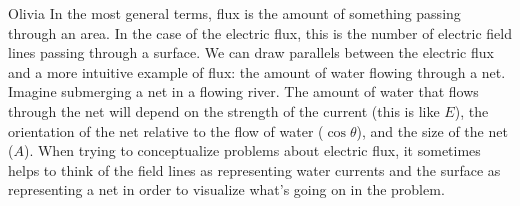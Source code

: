 \begin{studentOpinion}{Olivia}
In the most general terms, flux is the amount of something passing through an area. In the case of the electric flux, this is the number of electric field lines passing through a surface. We can draw parallels between the electric flux and a more intuitive example of flux: the amount of water flowing through a net. Imagine submerging a net in a flowing river. The amount of water that flows through the net will depend on the strength of the current (this is like $E$), the orientation of the net relative to the flow of water ($\cos\theta$), and the size of the net ($A$). When trying to conceptualize problems about electric flux, it sometimes helps to think of the field lines as representing water currents and the surface as representing a net in order to visualize what's going on in the problem. 
\end{studentOpinion}

